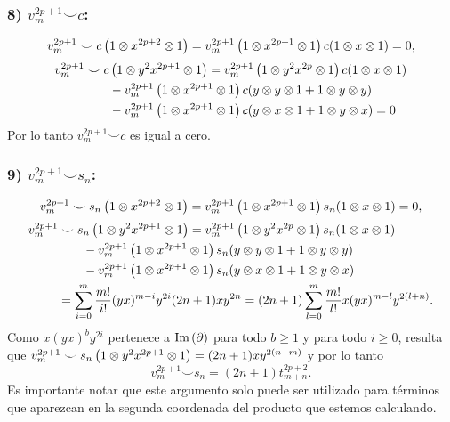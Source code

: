 \documentclass[fleqn,../tesis.tex]{subfiles}
\begin{document}
\subsubsection{8) $v_m^{2p + 1} \smile c$:}
\begin{align*}
	v_m^{2p + 1} \smile c\left(1 \otimes x^{2p + 2} \otimes 1\right)
		= v_m^{2p + 1}\left(1 \otimes x^{2p + 1} \otimes 1\right)c(1 \otimes x \otimes 1) = 0,
\end{align*}
\begin{align*}
	v_m^{2p + 1}& \smile c\left(1 \otimes y^2x^{2p + 1} \otimes 1\right)
		= v_m^{2p + 1}\left(1 \otimes y^2 x^{2p} \otimes 1\right)c(1 \otimes x \otimes 1)\\
		&\qquad- v_m^{2p + 1}\left(1 \otimes x^{2p + 1} \otimes 1\right)c(y \otimes y \otimes 1 + 1 \otimes y \otimes y)\\
		&\qquad -v_m^{2p + 1}\left(1 \otimes x^{2p + 1} \otimes 1\right)c(y \otimes x \otimes 1 + 1 \otimes y \otimes x) = 0
\end{align*}
Por lo tanto $v_m^{2p + 1} \smile c$ es igual a cero.
\subsubsection{9) $v_m^{2p + 1} \smile s_n$:}
\begin{align*}
	v_m^{2p + 1} \smile s_n\left(1 \otimes x^{2p + 2} \otimes 1\right)
		= v_m^{2p + 1}\left(1 \otimes x^{2p + 1} \otimes 1\right)s_n(1 \otimes x \otimes 1) = 0,
\end{align*}	
\begin{align*}
	v_m^{2p + 1}& \smile s_n\left(1 \otimes y^2x^{2p + 1} \otimes 1\right)
		= v_m^{2p + 1}\left(1 \otimes y^2 x^{2p} \otimes 1\right)s_n(1 \otimes x \otimes 1)\\
	&\qquad- v_m^{2p + 1}\left(1 \otimes x^{2p + 1} \otimes 1\right)s_n(y \otimes y \otimes 1 + 1 \otimes y \otimes y)\\
	&\qquad -v_m^{2p + 1}\left(1 \otimes x^{2p + 1} \otimes 1\right)s_n(y \otimes x \otimes 1 + 1 \otimes y \otimes x)\\
	&= \sum_{i = 0}^{m}\frac{m!}{i!}(yx)^{m - i}y^{2i}(2n + 1)xy^{2n}
		=(2n + 1)\sum_{l = 0}^{m}\frac{m!}{l!}x(yx)^{m - l}y^{2(l + n)}.
\end{align*}
Como $x(yx)^{b}y^{2i}$ pertenece a $\operatorname{Im}\left(\partial\right)$ para todo $b\geq 1$ y para todo
$i \geq 0$, resulta que $v_m^{2p + 1}\smile s_n\left(1 \otimes y^2x^{2p + 1} \otimes 1\right) = (2n + 1)xy^{2(n + m)}$
y por lo tanto \[v_m^{2p + 1}\smile s_n =(2n + 1)t_{m + n}^{2p + 2}.\]
Es importante notar que este argumento solo puede ser utilizado para términos que aparezcan en la segunda coordenada
del producto que estemos calculando.
\end{document}
